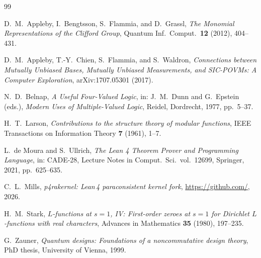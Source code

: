 \documentclass[12pt,a4paper]{article}
\begin{document}
\begin{thebibliography}{99}

D.\ M.\ Appleby, I.\ Bengtsson, S.\ Flammia, and D.\ Grassl,
\textit{The Monomial Representations of the Clifford Group},
Quantum Inf.\ Comput.\ \textbf{12} (2012), 404--431.

D.\ M.\ Appleby, T.-Y.\ Chien, S.\ Flammia, and S.\ Waldron,
\textit{Connections between Mutually Unbiased Bases, Mutually Unbiased Measurements,
and SIC-POVMs: A Computer Exploration},
arXiv:1707.05301 (2017).

N.\ D.\ Belnap,
\textit{A Useful Four-Valued Logic},
in: J.\ M.\ Dunn and G.\ Epstein (eds.), \textit{Modern Uses of Multiple-Valued Logic},
Reidel, Dordrecht, 1977, pp.\ 5--37.

H.\ T.\ Larson,
\textit{Contributions to the structure theory of modular functions},
IEEE Transactions on Information Theory \textbf{7} (1961), 1--7.

L.\ de Moura and S.\ Ullrich,
\textit{The Lean 4 Theorem Prover and Programming Language},
in: CADE-28, Lecture Notes in Comput.\ Sci.\ vol.\ 12699, Springer, 2021, pp.\ 625--635.

C.\ L.\ Mills,
\textit{p4rakernel: Lean\,4 paraconsistent kernel fork},
\url{https://github.com/}, 2026.

H.\ M.\ Stark,
\textit{$L$-functions at $s=1$, IV: First-order zeroes at $s=1$ for Dirichlet
$L$-functions with real characters},
Advances in Mathematics \textbf{35} (1980), 197--235.

G.\ Zauner,
\textit{Quantum designs: Foundations of a noncommutative design theory},
PhD thesis, University of Vienna, 1999.

\end{thebibliography}
\end{document}
